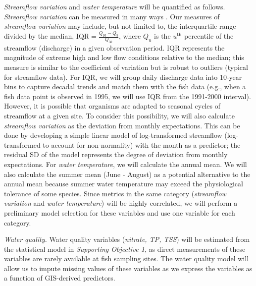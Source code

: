 \documentclass[12pt, class=article, crop=false]{standalone}
\begin{document}
\textit{Streamflow variation} and \textit{water temperature} will be quantified as follows.
\textit{Streamflow variation} can be measured in many ways \citep{olden_redundancy_2003}.
Our measures of \textit{streamflow variation} may include, but not limited to, the interquartile range divided by the median, $\mbox{IQR} = \frac{Q_{95} - Q_{5}}{Q_{50}}$, where $Q_{u}$ is the $u^{\text{th}}$ percentile of the streamflow (discharge) in a given observation period.
$\mbox{IQR}$ represents the magnitude of extreme high and low flow conditions relative to the median; this measure is similar to the coefficient of variation but is robust to outliers (typical for streamflow data).
For $\mbox{IQR}$, we will group daily discharge data into 10-year bins to capture decadal trends and match them with the fish data (e.g., when a fish data point is observed in 1995, we will use $\mbox{IQR}$ from the 1991-2000 interval).
However, it is possible that organisms are adapted to seasonal cycles of streamflow at a given site. To consider this possibility, we will also calculate \textit{streamflow variation} as the deviation from monthly expectations.
This can be done by developing a simple linear model of log-transformed streamflow (log-transformed to account for non-normality) with the month as a predictor; the residual SD of the model represents the degree of deviation from monthly expectations.
For \textit{water temperature}, we will calculate the annual mean.
We will also calculate the summer mean (June - August) as a potential alternative to the annual mean because summer water temperature may exceed the physiological tolerance of some species.
Since metrics in the same category (\textit{streamflow variation} and \textit{water temperature}) will be highly correlated, we will perform a preliminary model selection for these variables and use one variable for each category.

\textit{Water quality.} Water quality variables (\textit{nitrate, TP, TSS}) will be estimated from the statistical model in \textit{Supporting Objective 1}, as direct measurements of these variables are rarely available at fish sampling sites.
The water quality model will allow us to impute missing values of these variables as we express the variables as a function of GIS-derived predictors.
\end{document}
